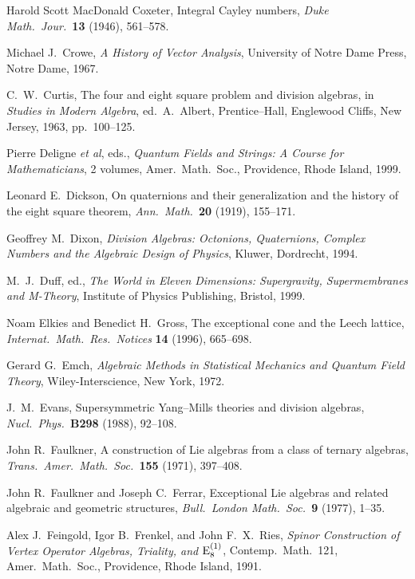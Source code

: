 \documentclass[12pt]{article}
\newcommand{\E}{{\rm E}}
\begin{document}
\begin{thebibliography}{10}
 Harold Scott MacDonald Coxeter, Integral Cayley    
numbers, {\sl Duke Math.\ Jour.\ }{\bf 13} (1946), 561--578.   
   
 Michael J.\ Crowe, {\sl A History of Vector Analysis},   
University of Notre Dame Press, Notre Dame, 1967.   

 C.\ W.\ Curtis, The four and eight square problem    
and division algebras, in {\sl Studies in Modern Algebra}, ed.\    
A.\ Albert, Prentice--Hall, Englewood Cliffs, New Jersey, 1963, pp.\ 100--125.
 
 Pierre Deligne {\it et al}, eds., {\sl Quantum
Fields and Strings: A Course for Mathematicians}, 2 volumes, Amer.\ 
Math.\ Soc., Providence, Rhode Island, 1999. 
 
 Leonard E.\ Dickson, On quaternions and their  
generalization and the history of the eight square theorem, {\sl
Ann.\ Math.\ }{\bf 20} (1919), 155--171.   
   
 Geoffrey M.\ Dixon, {\sl Division Algebras: Octonions,   
Quaternions, Complex Numbers and the Algebraic Design of Physics},   
Kluwer, Dordrecht, 1994.   
 
 M.\ J.\ Duff, ed., {\sl The World in Eleven Dimensions:  
Supergravity, Supermembranes and M-Theory}, Institute of Physics 
Publishing, Bristol, 1999. 
 
 Noam Elkies and Benedict H.\ Gross, The exceptional
cone and the Leech lattice, {\sl Internat.\ Math.\ Res.\ Notices}
{\bf 14} (1996), 665--698.

 Gerard G.\ Emch, {\sl Algebraic Methods in Statistical 
Mechanics and Quantum Field Theory}, Wiley-Interscience, New York, 1972.

\bibitem{Evans} J.\ M.\ Evans, Supersymmetric Yang--Mills theories and   
division algebras, {\sl Nucl.\ Phys.\ }{\bf B298} (1988), 92--108.   
   
\bibitem{Faulkner} John R.\ Faulkner, A construction of Lie algebras from
a class of ternary algebras, {\sl Trans.\ Amer.\ Math.\ Soc.\ }{\bf 155}
(1971), 397--408.

 John R.\ Faulkner and Joseph C.\ Ferrar,    
Exceptional Lie algebras and related algebraic and geometric structures,   
{\sl Bull.\ London Math.\ Soc.\ }{\bf 9} (1977), 1--35.   

 Alex J.\ Feingold, Igor B.\ Frenkel, and John F.\ X.\
Ries, {\sl Spinor Construction of Vertex Operator Algebras, Triality, and
$\E_8^{(1)}$}, Contemp.\ Math.\ 121, Amer.\ Math.\ Soc., 
Providence, Rhode Island, 1991.


\end{thebibliography}
\end{document}
